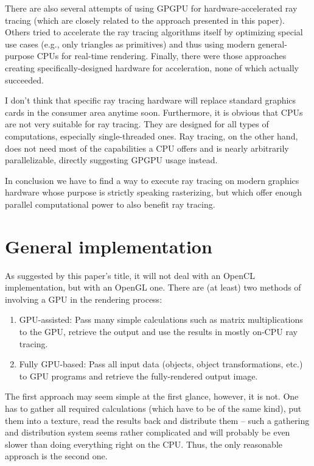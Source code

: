 \documentclass[english,fleqn,10pt,twocolumn]{article}
\begin{document}
There are also several attempts of using GPGPU for hardware-accelerated ray tracing (which are closely related to the approach presented in this paper). Others tried to accelerate the ray tracing algorithms itself by optimizing special
use cases (e.g., only triangles as primitives) and thus using modern general-purpose CPUs for real-time rendering. Finally, there were those approaches creating specifically-designed hardware for acceleration, none of which actually
succeeded.

I don't think that specific ray tracing hardware will replace standard graphics cards in the consumer area anytime soon. Furthermore, it is obvious that CPUs are not very suitable for ray tracing. They are designed for all types of
computations, especially single-threaded ones. Ray tracing, on the other hand, does not need most of the capabilities a CPU offers and is nearly arbitrarily parallelizable, directly suggesting GPGPU usage instead.

In conclusion we have to find a way to execute ray tracing on modern graphics hardware whose purpose is strictly speaking rasterizing, but which offer enough parallel computational power to also benefit ray tracing.


\section{General implementation}

As suggested by this paper's title, it will not deal with an OpenCL implementation, but with an OpenGL one. There are (at least) two methods of involving a GPU in the rendering process:
\begin{enumerate}
    \item GPU-assisted: Pass many simple calculations such as matrix multiplications to the GPU, retrieve the output and use the results in mostly on-CPU ray tracing.
    \item Fully GPU-based: Pass all input data (objects, object transformations, etc.) to GPU programs and retrieve the fully-rendered output image.
\end{enumerate}

The first approach may seem simple at the first glance, however, it is not. One has to gather all required calculations (which have to be of the same kind), put them into a texture, read the results back and distribute them -- such a
gathering and distribution system seems rather complicated and will probably be even slower than doing everything right on the CPU. Thus, the only reasonable approach is the second one.
\end{document}
